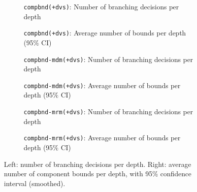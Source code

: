 \begin{figure}
	\centering

	\begin{subfigure}{0.495\textwidth}
		\centering
		
		\caption{\texttt{compbnd(+dvs)}: Number of branching decisions per depth}
		\label{fig:compbnd_depths_distribution}
	\end{subfigure}
	\hfill
	\begin{subfigure}{0.495\textwidth}
		\centering
		
		\caption{\texttt{compbnd(+dvs)}: Average number of bounds per depth (95\% CI)}
		\label{fig:compbnd_avg_num_bounds_vs_depth}
	\end{subfigure}

	\vspace{1em}

	\begin{subfigure}{0.495\textwidth}
		\centering
		
		\caption{\texttt{compbnd-mdm(+dvs)}: Number of branching decisions per depth}
		\label{fig:compbnd-mdm_depths_distribution}
	\end{subfigure}
	\hfill
	\begin{subfigure}{0.495\textwidth}
		\centering
		
		\caption{\texttt{compbnd-mdm(+dvs)}: Average number of bounds per depth (95\% CI)}
		\label{fig:compbnd-mdm_avg_num_bounds_vs_depth}
	\end{subfigure}

	\vspace{1em}

	\begin{subfigure}{0.495\textwidth}
		\centering
		
		\caption{\texttt{compbnd-mrm(+dvs)}: Number of branching decisions per depth}
		\label{fig:compbnd-mrm_depths_distribution}
	\end{subfigure}
	\hfill
	\begin{subfigure}{0.495\textwidth}
		\centering
		
		\caption{\texttt{compbnd-mrm(+dvs)}: Average number of bounds per depth (95\% CI)}
		\label{fig:compbnd-mrm_avg_num_bounds_vs_depth}
	\end{subfigure}

	\caption{Left: number of branching decisions per depth. Right: average number of component bounds per depth, with 95\% confidence interval (smoothed).}
	\label{fig:comparison_depth}
\end{figure}

